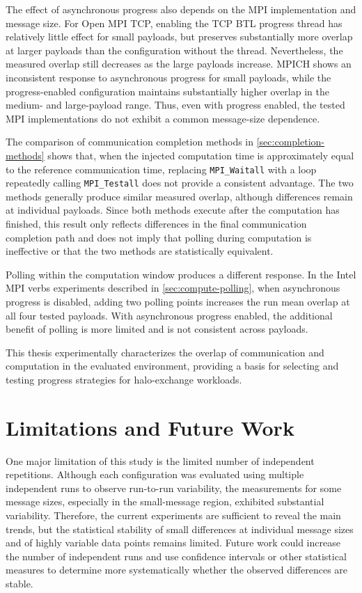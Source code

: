 The effect of asynchronous progress also depends on the MPI implementation and message size. For Open MPI TCP, enabling the TCP BTL progress thread has relatively little effect for small payloads, but preserves substantially more overlap at larger payloads than the configuration without the thread. Nevertheless, the measured overlap still decreases as the large payloads increase. MPICH shows an inconsistent response to asynchronous progress for small payloads, while the progress-enabled configuration maintains substantially higher overlap in the medium- and large-payload range. Thus, even with progress enabled, the tested MPI implementations do not exhibit a common message-size dependence.

The comparison of communication completion methods in \autoref{sec:completion-methods} shows that, when the injected computation time is approximately equal to the reference communication time, replacing \texttt{MPI\_Waitall} with a loop repeatedly calling \texttt{MPI\_Testall} does not provide a consistent advantage. The two methods generally produce similar measured overlap, although differences remain at individual payloads. Since both methods execute after the computation has finished, this result only reflects differences in the final communication completion path and does not imply that polling during computation is ineffective or that the two methods are statistically equivalent.

Polling within the computation window produces a different response. In the Intel MPI verbs experiments described in \autoref{sec:compute-polling}, when asynchronous progress is disabled, adding two polling points increases the run mean overlap at all four tested payloads. With asynchronous progress enabled, the additional benefit of polling is more limited and is not consistent across payloads.

This thesis experimentally characterizes the overlap of communication and
computation in the evaluated environment, providing
a basis for selecting and testing progress strategies for halo-exchange
workloads.

\section{Limitations and Future Work}

One major limitation of this study is the limited number of independent repetitions. Although each configuration was evaluated using multiple independent runs to observe run-to-run variability, the measurements for some message sizes, especially in the small-message region, exhibited substantial variability. Therefore, the current experiments are sufficient to reveal the main trends, but the statistical stability of small differences at individual message sizes and of highly variable data points remains limited. Future work could increase the number of independent runs and use confidence intervals or other statistical measures to determine more systematically whether the observed differences are stable.

